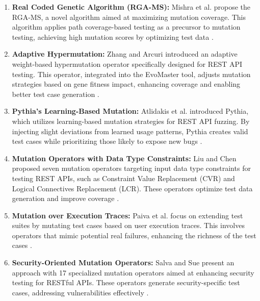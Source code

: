 \documentclass[12pt, letterpaper,twocolumn]{article}
\theoremstyle{remark}
\theoremstyle{definition}
\begin{document}
\begin{enumerate}

    \item \textbf{Real Coded Genetic Algorithm (RGA-MS):} 
    Mishra et al. propose the RGA-MS, a novel algorithm aimed at maximizing mutation coverage. This algorithm applies path coverage-based testing as a precursor to mutation testing, achieving high mutation scores by optimizing test data \cite{mishra2022novel}.

    \item \textbf{Adaptive Hypermutation:} 
    Zhang and Arcuri introduced an adaptive weight-based hypermutation operator specifically designed for REST API testing. This operator, integrated into the EvoMaster tool, adjusts mutation strategies based on gene fitness impact, enhancing coverage and enabling better test case generation \cite{zhang2021adaptive}.

    \item \textbf{Pythia's Learning-Based Mutation:}
    Atlidakis et al. introduced Pythia, which utilizes learning-based mutation strategies for REST API fuzzing. By injecting slight deviations from learned usage patterns, Pythia creates valid test cases while prioritizing those likely to expose new bugs \cite{atlidakis2020pythia}.

    \item \textbf{Mutation Operators with Data Type Constraints:}
    Liu and Chen proposed seven mutation operators targeting input data type constraints for testing REST APIs, such as Constraint Value Replacement (CVR) and Logical Connectives Replacement (LCR). These operators optimize test data generation and improve coverage \cite{liu2017optimized}.

    \item \textbf{Mutation over Execution Traces:}
    Paiva et al. focus on extending test suites by mutating test cases based on user execution traces. This involves operators that mimic potential real failures, enhancing the richness of the test cases \cite{paiva2020test}.

    \item \textbf{Security-Oriented Mutation Operators:}
    Salva and Sue present an approach with 17 specialized mutation operators aimed at enhancing security testing for RESTful APIs. These operators generate security-specific test cases, addressing vulnerabilities effectively \cite{salva2020security}.

\end{enumerate}
\end{document}
